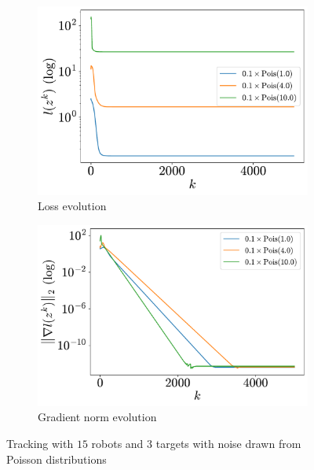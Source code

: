\documentclass[a4paper,11pt,oneside]{book}
\begin{document}
\begin{figure}[H]
      \centering
      \begin{subfigure}[t]{0.46\linewidth}
            \centering
            \includegraphics[width=\linewidth]{./figs/tracking/poisson/loss.pdf} 
            \caption{Loss evolution}
      \end{subfigure}
      \hfill
      \begin{subfigure}[t]{0.46\linewidth}
            \centering
            \includegraphics[width=\linewidth]{./figs/tracking/poisson/gradient.pdf} 
            \caption{Gradient norm evolution}
      \end{subfigure}
      \caption{Tracking with $15$ robots and $3$ targets with noise drawn from Poisson distributions}
      \label{fig:tracking_poisson_15_3}
\end{figure}
\end{document}
